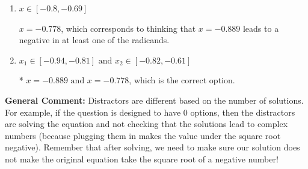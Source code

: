 \documentclass{extbook}[14pt]
\begin{document}
\begin{enumerate}
{\begin{enumerate}[label=\Alph*.]
Corresponds to thinking that $x = -0.889 \text{ and } x = -0.778$ lead to negatives in at least one of the radicands.
\item \( x \in [-0.8,-0.69] \)

$x = -0.778$, which corresponds to thinking that $x = -0.889$ leads to a negative in at least one of the radicands.
\item \( x_1 \in [-0.94, -0.81] \text{ and } x_2 \in [-0.82,-0.61] \)

* $x = -0.889 \text{ and } x = -0.778$, which is the correct option.
\end{enumerate}

\textbf{General Comment:} Distractors are different based on the number of solutions. For example, if the question is designed to have 0 options, then the distractors are solving the equation and not checking that the solutions lead to complex numbers (because plugging them in makes the value under the square root negative). Remember that after solving, we need to make sure our solution does not make the original equation take the square root of a negative number!
}
\end{enumerate}
\end{document}

